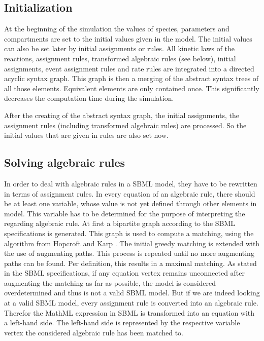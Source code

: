 \documentclass[10pt]{bmc_article}
\newenvironment{bmcformat}{\baselineskip20pt\sloppy\setboolean{publ}{false}}{\baselineskip20pt\sloppy}
\begin{document}
\begin{bmcformat}
\subsection{Initialization}

At the beginning of the simulation the values of species, parameters and
compartments are set to the initial values given in the model.
The initial values can also be set later by initial assignments or rules.
All kinetic laws of the reactions, assignment rules, transformed algebraic
rules (see below), initial assignments, event assignment rules and rate rules
are integrated into a directed acyclic syntax graph.
This graph is then a merging of the abstract syntax trees of all those elements.
Equivalent elements are only contained once.
This significantly decreases the computation time during the simulation.

After the creating of the abstract syntax graph, the initial assignments, the
assignment rules (including transformed algebraic rules) are processed.
So the initial values that are given in rules are also set now.


\subsection{Solving algebraic rules}
In order to deal with algebraic rules in a SBML model, they have to be rewritten in terms
of assignment rules. In every equation of an algebraic rule, there should be at least one variable, 
whose value is not yet defined through other elements in model. This variable has to be determined 
for the purpose of interpreting the regarding algebraic rule.
At first a bipartite graph according to the SBML specifications is generated. This graph is used to 
compute a matching, using the algorithm from Hopcroft and Karp
\cite{hopcroft1973n}. The initial greedy matching is extended with the use of augmenting paths. This process is
repeated until no more augmenting paths can be found. Per definition, this results in a maximal matching. 
As stated in the SBML specifications, if any equation vertex remains unconnected after augmenting the 
matching as far as possible, the model is considered overdetermined and thus is not a valid SBML model. 
But if we are indeed looking at a valid SBML model, every assignment rule is converted into an algebraic rule. 
Therefor the MathML expression in SBML is transformed into an equation with a left-hand side. The left-hand 
side is represented by the respective variable vertex the considered algebraic rule has been matched to.



\end{bmcformat}
\end{document}
